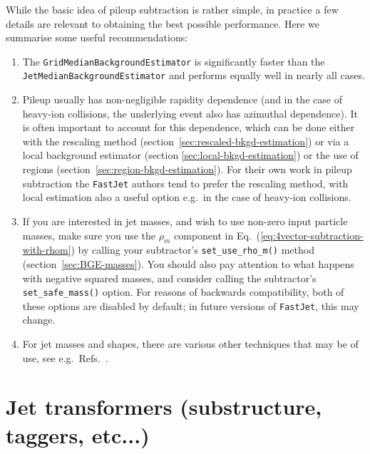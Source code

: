 \documentclass[12pt,a4]{article}
\newcommand{\fastjet}{\texttt{FastJet}\xspace}
\newcommand{\ttt}[1]{{\small\texttt{#1}}}
\begin{document}
While the basic idea of pileup subtraction is rather simple, in
practice a few details are relevant to obtaining the best possible
performance.
%
Here we summarise some useful recommendations:
\begin{enumerate}
\item The \ttt{GridMedianBackgroundEstimator} is significantly faster
  than the \ttt{JetMedianBackgroundEstimator} and performs equally
  well in nearly all cases.

\item Pileup usually has non-negligible rapidity dependence (and
  in the case of heavy-ion collisions, the underlying event also has
  azimuthal dependence).  
  It is often important to account for this dependence, which can be
  done either with the rescaling method
  (section~\ref{sec:rescaled-bkgd-estimation}) or via a local
  background estimator (section \ref{sec:local-bkgd-estimation}) or
  the use of regions (section~\ref{sec:region-bkgd-estimation}).
  For their own work in pileup subtraction the \fastjet authors tend
  to prefer the rescaling method, with local estimation also a useful
  option e.g.\ in the case of heavy-ion collisions.

\item If you are interested in jet masses, and wish to use non-zero
  input particle masses, make sure you use the $\rho_m$ component in
  Eq.~(\ref{eq:4vector-subtraction-with-rhom}) by calling your
  subtractor's \ttt{set\_use\_rho\_m()} method
  (section~\ref{sec:BGE-masses}).
  You should also pay attention to what happens with negative squared
  masses, and consider calling the subtractor's \ttt{set\_safe\_mass()}
  option.
  For reasons of backwards compatibility, both of these options are
  disabled by default; in future versions of \fastjet, this may change.

\item For jet masses and shapes, there are various other techniques
  that may be of use, see e.g.\
  Refs.~\cite{Cacciari:2012mu,Soyez:2012hv,Krohn:2013lba,Cacciari:2014jta,Berta:2014eza,Cacciari:2014gra,Bertolini:2014bba}.
\end{enumerate}



\section{Jet transformers (substructure, taggers, etc...)}
\label{sec:transformers}
\end{document}
